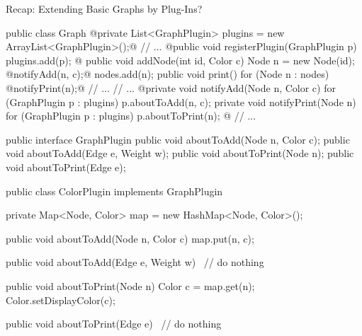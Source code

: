 \begin{frame}[fragile]{Recap: Extending Basic Graphs by Plug-Ins?}
	\tiny\begin{mycolumns}[columns=2,widths={50,50}]
\begin{codetight}{}
public class Graph {
	@private List<GraphPlugin> plugins = new ArrayList<GraphPlugin>();@
	// ...	
	@public void registerPlugin(GraphPlugin p){
		plugins.add(p);
	}@
	public void addNode(int id, Color c){
		Node n = new Node(id);
		@notifyAdd(n, c);@
		nodes.add(n);
	}
	public void print() {
		for (Node n : nodes) {
			@notifyPrint(n);@
			// ...
		}
		// ...
	}
	@private void notifyAdd(Node n, Color c) {
		for (GraphPlugin p : plugins) {
			p.aboutToAdd(n, c);
		}
	}
	private void notifyPrint(Node n) {
		for (GraphPlugin p : plugins) {
			p.aboutToPrint(n);
		}
	}@
	// ...
}
\end{codetight}
		\mynextcolumn
\begin{codetight}{}
public interface GraphPlugin {
	public void aboutToAdd(Node n, Color c);
	public void aboutToAdd(Edge e, Weight w);
	public void aboutToPrint(Node n);
	public void aboutToPrint(Edge e);
}
\end{codetight}
\begin{codetight}{}
public class ColorPlugin implements GraphPlugin {
	private Map<Node, Color> map = new HashMap<Node, Color>();

	public void aboutToAdd(Node n, Color c) {
		map.put(n, c);
	}
	
	public void aboutToAdd(Edge e, Weight w) {
		~// do nothing~
	}
	
	public void aboutToPrint(Node n) {
		Color c = map.get(n);
		Color.setDisplayColor(c);
	}
	
	public void aboutToPrint(Edge e) {
		~// do nothing~
	}
}
\end{codetight}
	\end{mycolumns}
\end{frame}

